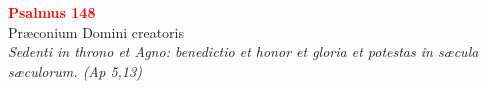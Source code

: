 


\def\greinitialformat#1{%
{\fontsize{39}{39}\selectfont #1}%
}




\vspace{0.3cm}
\begin{center}
 \textcolor{red}{\large \bf Psalmus 148}\\
Præconium Domini creatoris\\
\textit{\small Sedenti in throno et Agno: benedictio et honor et gloria et potestas in sæcula sæculorum. (Ap 5,13)}
\end{center}
